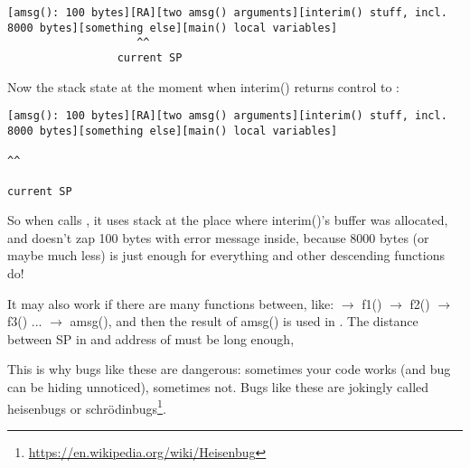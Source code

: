 \begin{lstlisting}
[amsg(): 100 bytes][RA][two amsg() arguments][interim() stuff, incl. 8000 bytes][something else][main() local variables]
                    ^^
                 current SP
\end{lstlisting}

Now the stack state at the moment when interim() returns control to \main{}:

\begin{lstlisting}
[amsg(): 100 bytes][RA][two amsg() arguments][interim() stuff, incl. 8000 bytes][something else][main() local variables]
                                                                                        ^^
                                                                                     current SP
\end{lstlisting}

So when \main calls \printf, it uses stack at the place where interim()'s buffer was allocated,
and doesn't zap 100 bytes with error message inside, because 8000 bytes (or maybe much less) is just enough for everything
\printf and other descending functions do!

It may also work if there are many functions between, like:
\main $\rightarrow$ f1() $\rightarrow$ f2() $\rightarrow$ f3() ... $\rightarrow$ amsg(),
and then the result of amsg() is used in \main.
The distance between \ac{SP} in \main and address of \TT{buf[]} must be long enough,

This is why bugs like these are dangerous: sometimes your code works (and bug can be hiding unnoticed), sometimes not.
Bugs like these are jokingly called heisenbugs or schrödinbugs\footnote{\url{https://en.wikipedia.org/wiki/Heisenbug}}.

